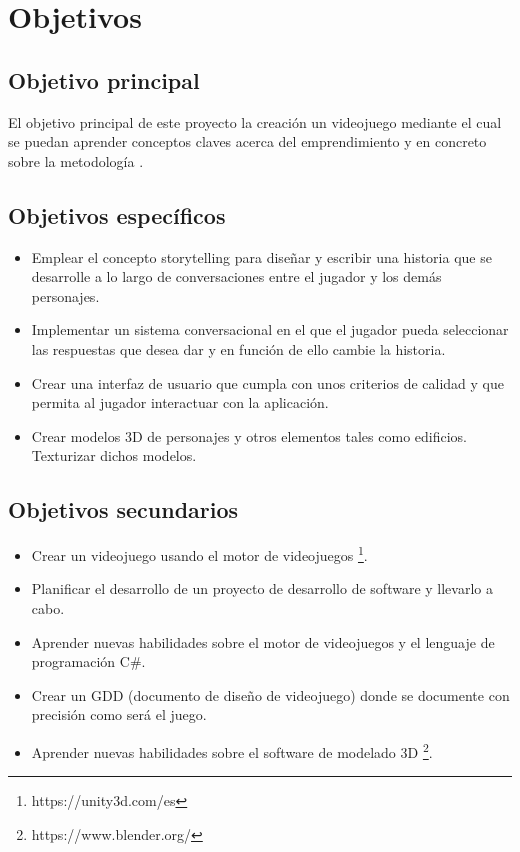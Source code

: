 \chapter{Objetivos}

\section{Objetivo principal}

El objetivo principal de este proyecto la creación un videojuego mediante el cual se puedan aprender conceptos claves acerca del emprendimiento y en concreto sobre la metodología .


\section{Objetivos específicos}

\begin{itemize}
	\item Emplear el concepto storytelling para diseñar y escribir una historia que se desarrolle a lo largo de conversaciones entre el jugador y los demás personajes.
	\item Implementar un sistema conversacional en el que el jugador pueda seleccionar las respuestas que desea dar y en función de ello cambie la historia.
	\item Crear una interfaz de usuario que cumpla con unos criterios de calidad y que permita al jugador interactuar con la aplicación.
	\item Crear modelos 3D de personajes y otros elementos tales como edificios. Texturizar dichos modelos.
\end{itemize}


\section{Objetivos secundarios}

\begin{itemize}
	\item Crear un videojuego usando el motor de videojuegos \footnote{https://unity3d.com/es}.
	\item Planificar el desarrollo de un proyecto de desarrollo de software y llevarlo a cabo.
	\item Aprender nuevas habilidades sobre el motor de videojuegos  y el lenguaje de programación C\#.
	\item Crear un GDD (documento de diseño de videojuego) donde se documente con precisión como será el juego.
	\item Aprender nuevas habilidades sobre el software de modelado 3D \footnote{https://www.blender.org/}.

\end{itemize}



